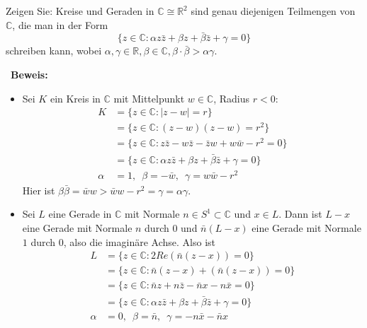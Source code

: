 \begin{assignment}
  Zeigen Sie: Kreise und Geraden in \( \mathbb{C} \cong \mathbb{R}^2 \) sind genau diejenigen Teilmengen von \( \mathbb{C} \), die man in der Form
  \begin{equation*}
    \{ z \in \mathbb{C} : \alpha z \bar{z}+ \beta z + \bar{\beta} \bar{z} + \gamma = 0 \} 
  \end{equation*}
  schreiben kann, wobei \( \alpha, \gamma \in \mathbb{R}, \beta \in \mathbb{C}, \beta \cdot \bar{ \beta} > \alpha \gamma \).
\end{assignment}
\begin{solution}
  \
  \textbf{Beweis:}
  \begin{itemize}
    \item Sei \( K \) ein Kreis in \( \mathbb{C} \) mit Mittelpunkt \( w \in \mathbb{C} \), Radius \( r < 0 \):
    \begin{align*} 
      K &= \{ z \in \mathbb{C} : \vert z - w \vert = r \} \\
      &= \{ z \in \mathbb{C} : (z - w)(z-w) = r^2\} \\
      &= \{ z \in \mathbb{C} : z \bar{z} - w \bar{z} - \bar{z} w + w \bar{w} - r^2 = 0 \} \\
      &= \{ z \in \mathbb{C} : \alpha z \bar{z} + \beta z + \bar{\beta} \bar{z} + \gamma = 0 \} \\
      \alpha &= 1, \enspace \beta = - \bar{w}, \enspace \gamma = w \bar{w} - r^2
    \end{align*}
    Hier ist \( \beta \bar{\beta} = \bar{w}w > \bar{w} w - r^2 = \gamma = \alpha \gamma \).
    \item Sei \( L \) eine Gerade in \( \mathbb{C} \) mit Normale \( n \in S^1 \subset \mathbb{C} \) und \( x \in L \). Dann ist \( L - x \) eine Gerade mit Normale \( n \) durch \( 0 \) und \( \bar{n}(L -x) \) eine Gerade mit Normale \( 1 \) durch \( 0 \), also die imaginäre Achse.
    Also ist 
    \begin{align*}
      L &= \{ z \in \mathbb{C}: 2 Re(\bar{n}(z - x)) = 0 \} \\
      &= \{ z \in \mathbb{C}: \bar{n}(z-x) + (\bar{n}(z - x)) = 0 \} \\
      &= \{ z \in \mathbb{C}: \bar{n}z + n \bar{z} - \bar{n}x - n \bar{x}= 0 \} \\
      &= \{ z \in \mathbb{C}: \alpha z \bar{z} + \beta z + \bar{\beta} \bar{z} + \gamma = 0 \} \\
      \alpha &= 0, \enspace \beta = \bar{n}, \enspace \gamma = -n \bar{x} - \bar{n} x \\

\end{align*}
\end{itemize}
\end{solution}
